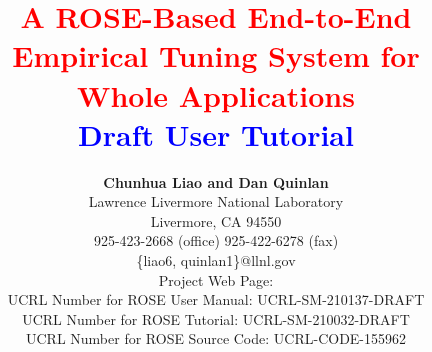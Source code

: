 \documentclass[10pt]{article}
\begin{document}

\title{ {\bf \textcolor{red}{A ROSE-Based End-to-End Empirical Tuning
  System for Whole Applications} \\ 
              \textcolor{blue}{Draft User Tutorial} \\
              } }
\author{ {\bf Chunhua Liao and Dan Quinlan} \\
         Lawrence Livermore National Laboratory \\ 
         Livermore, CA  94550 \\
         925-423-2668 (office)  925-422-6278 (fax) \\
         \{liao6, quinlan1\}@llnl.gov \\
         Project Web Page:
          \\
         UCRL Number for ROSE User Manual: UCRL-SM-210137-DRAFT \\
         UCRL Number for ROSE Tutorial: UCRL-SM-210032-DRAFT \\
         UCRL Number for ROSE Source Code: UCRL-CODE-155962 \\ \\
          \\
          \\
       }
\maketitle
\newpage


\setcounter{tocdepth}{2}

\tableofcontents
\newpage
%











\listoffixmes
\end{document}
